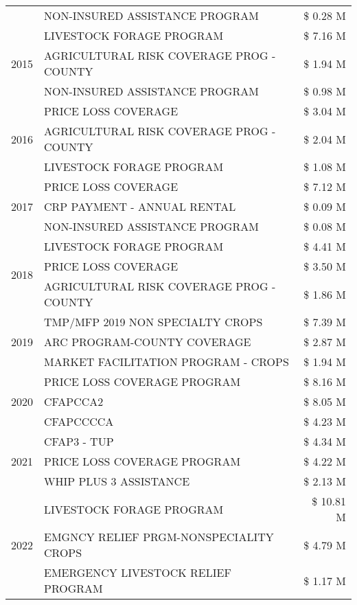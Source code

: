 \begin{tabular}{llr}
 & NON-INSURED ASSISTANCE PROGRAM & \$ 0.28 M \\
\cline{1-3}
\multirow[t]{3}{*}{2015} & LIVESTOCK FORAGE PROGRAM & \$ 7.16 M \\
 & AGRICULTURAL RISK COVERAGE PROG - COUNTY & \$ 1.94 M \\
 & NON-INSURED ASSISTANCE PROGRAM & \$ 0.98 M \\
\cline{1-3}
\multirow[t]{3}{*}{2016} & PRICE LOSS COVERAGE & \$ 3.04 M \\
 & AGRICULTURAL RISK COVERAGE PROG - COUNTY & \$ 2.04 M \\
 & LIVESTOCK FORAGE PROGRAM & \$ 1.08 M \\
\cline{1-3}
\multirow[t]{3}{*}{2017} & PRICE LOSS COVERAGE & \$ 7.12 M \\
 & CRP PAYMENT - ANNUAL RENTAL & \$ 0.09 M \\
 & NON-INSURED ASSISTANCE PROGRAM & \$ 0.08 M \\
\cline{1-3}
\multirow[t]{3}{*}{2018} & LIVESTOCK FORAGE PROGRAM & \$ 4.41 M \\
 & PRICE LOSS COVERAGE & \$ 3.50 M \\
 & AGRICULTURAL RISK COVERAGE PROG - COUNTY & \$ 1.86 M \\
\cline{1-3}
\multirow[t]{3}{*}{2019} & TMP/MFP 2019 NON SPECIALTY CROPS & \$ 7.39 M \\
 & ARC PROGRAM-COUNTY COVERAGE & \$ 2.87 M \\
 & MARKET FACILITATION PROGRAM - CROPS & \$ 1.94 M \\
\cline{1-3}
\multirow[t]{3}{*}{2020} & PRICE LOSS COVERAGE PROGRAM & \$ 8.16 M \\
 & CFAPCCA2 & \$ 8.05 M \\
 & CFAPCCCCA & \$ 4.23 M \\
\cline{1-3}
\multirow[t]{3}{*}{2021} & CFAP3 - TUP & \$ 4.34 M \\
 & PRICE LOSS COVERAGE PROGRAM & \$ 4.22 M \\
 & WHIP PLUS 3 ASSISTANCE & \$ 2.13 M \\
\cline{1-3}
\multirow[t]{3}{*}{2022} & LIVESTOCK FORAGE PROGRAM & \$ 10.81 M \\
 & EMGNCY RELIEF PRGM-NONSPECIALITY CROPS & \$ 4.79 M \\
 & EMERGENCY LIVESTOCK RELIEF PROGRAM & \$ 1.17 M \\
\cline{1-3}
\bottomrule
\end{tabular}
